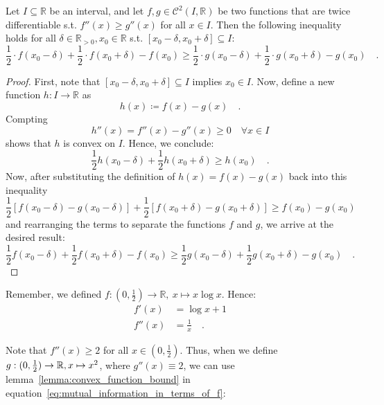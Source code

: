 \documentclass[../../main.tex]{subfiles}
\begin{document}
\begin{lemma}
    \label{lemma:convex_function_bound}
    Let $I \subseteq \mathbb{R}$ be an interval, and let $f, g \in \mathcal{C}^2(I, \mathbb{R})$ be two functions that are twice differentiable s.t. $f''(x) \geq g''(x)$ for all $x \in I$. Then the following inequality holds for all $\delta \in \mathbb{R}_{>0}, x_0 \in \mathbb{R}$ s.t. $[x_0 - \delta, x_0 + \delta] \subseteq I$:
    \[
        \frac{1}{2} \cdot f(x_0 - \delta) + \frac{1}{2} \cdot f(x_0 + \delta) - f(x_0) \geq \frac{1}{2} \cdot g(x_0 - \delta) + \frac{1}{2} \cdot g(x_0 + \delta) - g(x_0) \quad .
    \]
\end{lemma}
\begin{proof}
    First, note that $[x_0 - \delta, x_0 + \delta] \subseteq I$ implies $x_0 \in I$. Now, define a new function $h: I \to \mathbb{R}$ as
    \[
        h(x) \coloneqq f(x) - g(x) \quad .
    \]
    Compting
    \[
        h''(x) = f''(x) - g''(x) \geq 0 \quad \forall x \in I
    \]
    shows that $h$ is convex on $I$. Hence, we conclude:
    \[
        \frac{1}{2} h(x_0 - \delta) + \frac{1}{2} h(x_0 + \delta) \geq h(x_0) \quad .
    \]
    Now, after substituting the definition of $h(x) = f(x) - g(x)$ back into this inequality
    \[
        \frac{1}{2} [f(x_0 - \delta) - g(x_0 - \delta)] + \frac{1}{2} [f(x_0 + \delta) - g(x_0 + \delta)] \geq f(x_0) - g(x_0)
    \]
    and rearranging the terms to separate the functions $f$ and $g$, we arrive at the desired result:
    \[
        \frac{1}{2} f(x_0 - \delta) + \frac{1}{2} f(x_0 + \delta) - f(x_0) \geq \frac{1}{2} g(x_0 - \delta) + \frac{1}{2} g(x_0 + \delta) - g(x_0) \quad .
    \]
\end{proof}

Remember, we defined $f: (0, \frac{1}{2}) \to \mathbb{R}, \ x \mapsto x \log x$. Hence:
\begin{align*}
    f'(x) &= \log x + 1 \\
    f''(x) &= \frac{1}{x} \quad .
\end{align*}

Note that $f''(x) \geq 2$ for all $x \in (0, \frac{1}{2})$. Thus, when we define $g: (0, \frac{1}{2}) \to \mathbb{R}, \\ x \mapsto x^2$, where $g''(x) \equiv 2$, we can use lemma~\ref{lemma:convex_function_bound} in equation~\eqref{eq:mutual_information_in_terms_of_f}:
\end{document}
